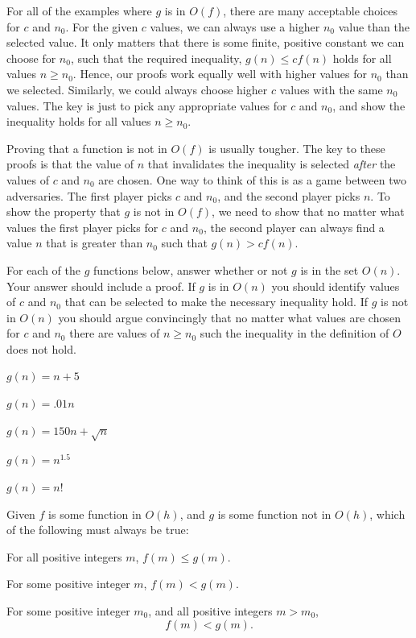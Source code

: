 \begin{schemeregion}
For all of the examples where $g$ is in $O(f)$, there are many acceptable choices for $c$ and $n_0$.  For the given $c$ values, we can always use a higher $n_0$ value than the selected value.  It only matters that there is some finite, positive constant we can choose for $n_0$, such that the required inequality, $g(n) \le cf(n)$ holds for all values $n \ge n_0$.  Hence, our proofs  work equally well with higher values for $n_0$ than we selected.  Similarly, we could always choose higher $c$ values with the same $n_0$ values.  The key is just to pick any appropriate values for $c$ and $n_0$, and show the inequality holds for all values $n \ge n_0$.

Proving that a function is not in $O(f)$ is usually tougher.  The key to these proofs is that the value of $n$ that invalidates the inequality is selected \emph{after} the values of $c$ and $n_0$ are chosen.  One way to think of this is as a game between two adversaries.  The first player picks $c$ and $n_0$, and the second player picks $n$.  To show the property that $g$ is not in $O(f)$, we need to show that no matter what values the first player picks for $c$ and $n_0$, the second player can always find a value $n$ that is greater than $n_0$ such that $g(n) > cf(n)$.

\begin{exercise}\label{ex:bigo}
For each of the $g$ functions below, answer whether or not $g$ is in the set $O(n)$.  Your answer should include a proof.  If $g$ is in $O(n)$ you should identify values of $c$ and $n_0$ that can be selected to make the necessary inequality hold.  If $g$ is not in $O(n)$ you should argue convincingly that no matter what values are chosen for $c$ and $n_0$ there are values of $n \ge n_0$ such the inequality in the definition of $O$ does not hold.
\begin{subexerciselist}
\item $g(n) = n + 5$
\item $g(n) = .01n$
\item $g(n) = 150n + \sqrt{n}$
\item $g(n) = n^{1.5}$
\item $g(n) = n!$
\end{subexerciselist}
\end{exercise}

\begin{exercise}\goldstar
Given $f$ is some function in $O(h)$, and $g$ is some function not in $O(h)$, which of the following must always be true:
\begin{subexerciselist}
\item For all positive integers $m$, $f(m) \le g(m)$.
\item For some positive integer $m$, $f(m) < g(m)$.
\item For some positive integer $m_0$, and all positive integers $m > m_0$, 
\begin{displaymath}
f(m) < g (m).
\end{displaymath}
\end{subexerciselist}
\end{exercise}


\end{schemeregion}
